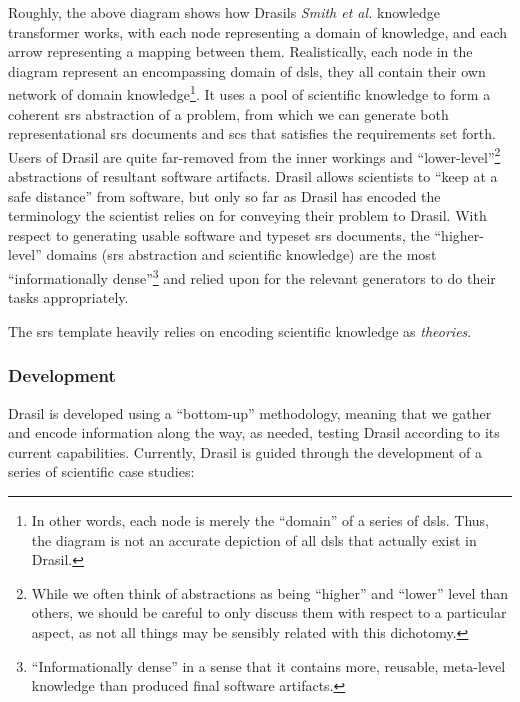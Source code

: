 \roughNetworkOfDomains{}

Roughly, the above diagram shows how Drasils \textit{Smith et al.} knowledge
transformer works, with each node representing a domain of knowledge, and each
arrow representing a mapping between them. Realistically, each node in the
diagram represent an encompassing domain of \acsp{dsl}, they all contain their
own network of domain knowledge\footnote{In other words, each node is merely the
``domain'' of a series of \acsp{dsl}. Thus, the diagram is not an accurate
depiction of all \acsp{dsl} that actually exist in Drasil.}. It uses a pool of
scientific knowledge to form a coherent \acs{srs} abstraction of a problem, from
which we can generate both representational \acs{srs} documents and \acs{scs}
that satisfies the requirements set forth. Users of Drasil are quite far-removed
from the inner workings and ``lower-level''\footnote{While we often think of
abstractions as being ``higher'' and ``lower'' level than others, we should be
careful to only discuss them with respect to a particular aspect, as not all
things may be sensibly related with this dichotomy.} abstractions of resultant
software artifacts. Drasil allows scientists to ``keep at a safe distance'' from
software, but only so far as Drasil has encoded the terminology the scientist
relies on for conveying their problem to Drasil. With respect to generating
usable software and typeset \acs{srs} documents, the ``higher-level'' domains
(\acs{srs} abstraction and scientific knowledge) are the most ``informationally
dense''\footnote{``Informationally dense'' in a sense that it contains more,
reusable, meta-level knowledge than produced final software artifacts.} and
relied upon for the relevant generators to do their tasks appropriately.

The \acs{srs} template heavily relies on encoding scientific knowledge as
\textit{theories}.


\subsubsection{Development}

Drasil is developed using a ``bottom-up'' methodology, meaning that we gather
and encode information along the way, as needed, testing Drasil according to its
current capabilities. Currently, Drasil is guided through the development of a
series of scientific case studies:

